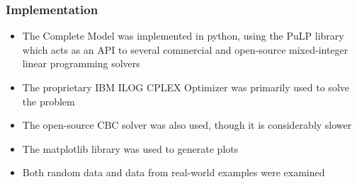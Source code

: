 \documentclass{beamer}
\begin{document}
\begin{frame}
    \frametitle{Implementation}
    \begin{itemize}
        \item The Complete Model was implemented in python, using the PuLP
            library which acts as an API to several commercial and open-source
            mixed-integer linear programming solvers
        \item The proprietary IBM ILOG CPLEX Optimizer was primarily used to
            solve the problem
        \item The open-source CBC solver was also used, though it is
            considerably slower
        \item The matplotlib library was used to generate plots
        \item Both random data and data from real-world examples were examined
    \end{itemize}
\end{frame}

\end{document}
